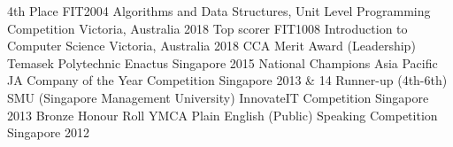\begin{cvhonors}
   \cvhonor
    {4th Place}
    {FIT2004 Algorithms and Data Structures, Unit Level Programming Competition}
    {Victoria, Australia}
    {2018}
  \cvhonor
    {Top scorer}
    {FIT1008 Introduction to Computer Science}
    {Victoria, Australia}
    {2018}
  \cvhonor
    {CCA Merit Award (Leadership)}
    {Temasek Polytechnic Enactus}
    {Singapore}
    {2015}
  \cvhonor
    {National Champions}
    {Asia Pacific JA Company of the Year Competition}
    {Singapore}
    {2013 \& 14}
  \cvhonor
    {Runner-up (4th-6th)}
    {SMU (Singapore Management University) InnovateIT Competition}
    {Singapore}
    {2013}
   \cvhonor
    {Bronze Honour Roll}
    {YMCA Plain English (Public) Speaking Competition}
    {Singapore}
    {2012}
\end{cvhonors}

